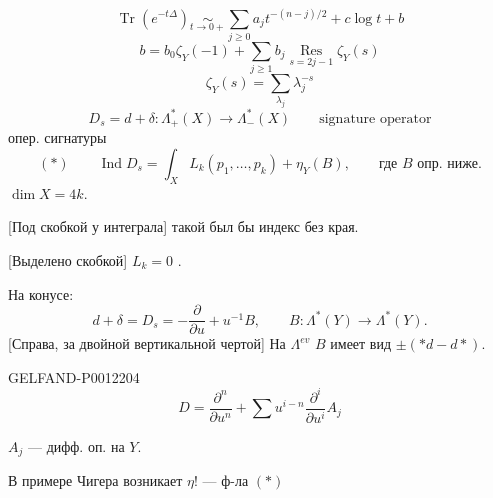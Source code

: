 \begin{equation*}
\operatorname{Tr}(e^{-t\Delta})\underset{t\to0+}{\sim}
\sum_{j\geq0}a_jt^{-(n-j)/2}+c\log t+b
\end{equation*}
\begin{equation*}
b=b_0\zeta_Y(-1)+\sum_{j\geq1}b_j
\underset{s=2j-1}{\operatorname{Res}}\zeta_Y(s)
\end{equation*}
\begin{equation*}
\zeta_Y(s)=\sum_{\lambda_j}\lambda_j^{-s}
\end{equation*}
\begin{equation*}
D_s=d+\delta:\Lambda^*_+(X)\longrightarrow\Lambda^*_-(X)
\qquad\text{signature operator}
\end{equation*}
опер. сигнатуры
\begin{equation*}
(*)\qquad \operatorname{Ind}D_s=\int_X L_k(p_1,\ldots,p_k)+\eta_Y(B),
\qquad\text{где \(B\) опр. ниже.}
\end{equation*}
\(\dim X=4k\).

[Под скобкой у интеграла] такой был бы индекс без края.

[Выделено скобкой] \(L_k=0\) .

На конусе:
\begin{equation*}
d+\delta=D_s=-\frac{\partial}{\partial u}+u^{-1}B,
\qquad B:\Lambda^*(Y)\longrightarrow\Lambda^*(Y).
\end{equation*}
[Справа, за двойной вертикальной чертой] На \(\Lambda^{ev}\) \(B\) имеет вид \(\pm(*d-d*)\).
\begin{GelfandAdjacentEvidence}{GELFAND-P001220}{4}
\begin{equation*}
D=\frac{\partial^n}{\partial u^n}+\sum u^{i-n}\frac{\partial^i}{\partial u^i}A_j
\end{equation*}
\end{GelfandAdjacentEvidence}


\(A_j\) --- дифф. оп. на \(Y\).


В примере Чигера возникает \(\eta\)! --- ф-ла \((*)\)


